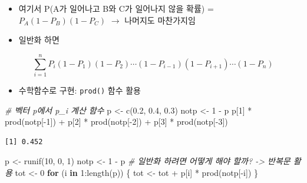 \documentclass[
  11pt,
]{krantz}
\newenvironment{Shaded}{\begin{snugshade}}{\end{snugshade}}
\newcommand{\CommentTok}[1]{\textcolor[rgb]{0.37,0.37,0.37}{\textit{#1}}}
\newcommand{\ControlFlowTok}[1]{\textcolor[rgb]{0.27,0.27,0.27}{\textbf{#1}}}
\newcommand{\DecValTok}[1]{\textcolor[rgb]{0.06,0.06,0.06}{#1}}
\newcommand{\FloatTok}[1]{\textcolor[rgb]{0.06,0.06,0.06}{#1}}
\newcommand{\FunctionTok}[1]{\textcolor[rgb]{0,0,0}{#1}}
\newcommand{\NormalTok}[1]{#1}
\newcommand{\OtherTok}[1]{\textcolor[rgb]{0.37,0.37,0.37}{#1}}
\newcommand{\SpecialCharTok}[1]{\textcolor[rgb]{0,0,0}{#1}}
\providecommand{\tightlist}{%
  \setlength{\itemsep}{0pt}\setlength{\parskip}{0pt}}
\begin{document}
\normalsize

\begin{itemize}
\tightlist
\item
  여기서 P(A가 일어나고 B와 C가 일어나지 않을 확률) = \(P_A(1-P_B)(1-P_C)\) \(\rightarrow\) 나머지도 마찬가지임
\item
  일반화 하면
\end{itemize}

\[
\sum_{i=1}^{n} P_i(1-P_1)(1-P_2)\cdots (1-P_{i-1})(1-P_{i+1})\cdots (1-P_{n})
\]

\begin{itemize}
\tightlist
\item
  수학함수로 구현: \texttt{prod()} 함수 활용
\end{itemize}

\footnotesize

\begin{Shaded}
\begin{Highlighting}[]
\CommentTok{\# 벡터 p에서 p\_i 계산 함수}
\NormalTok{p }\OtherTok{\textless{}{-}} \FunctionTok{c}\NormalTok{(}\FloatTok{0.2}\NormalTok{, }\FloatTok{0.4}\NormalTok{, }\FloatTok{0.3}\NormalTok{)}
\NormalTok{notp }\OtherTok{\textless{}{-}} \DecValTok{1} \SpecialCharTok{{-}}\NormalTok{ p}
\NormalTok{p[}\DecValTok{1}\NormalTok{] }\SpecialCharTok{*} \FunctionTok{prod}\NormalTok{(notp[}\SpecialCharTok{{-}}\DecValTok{1}\NormalTok{]) }\SpecialCharTok{+}
\NormalTok{p[}\DecValTok{2}\NormalTok{] }\SpecialCharTok{*} \FunctionTok{prod}\NormalTok{(notp[}\SpecialCharTok{{-}}\DecValTok{2}\NormalTok{]) }\SpecialCharTok{+}
\NormalTok{p[}\DecValTok{3}\NormalTok{] }\SpecialCharTok{*} \FunctionTok{prod}\NormalTok{(notp[}\SpecialCharTok{{-}}\DecValTok{3}\NormalTok{])}
\end{Highlighting}
\end{Shaded}

\begin{verbatim}
[1] 0.452
\end{verbatim}

\begin{Shaded}
\begin{Highlighting}[]
\NormalTok{p }\OtherTok{\textless{}{-}} \FunctionTok{runif}\NormalTok{(}\DecValTok{10}\NormalTok{, }\DecValTok{0}\NormalTok{, }\DecValTok{1}\NormalTok{)}
\NormalTok{notp }\OtherTok{\textless{}{-}} \DecValTok{1} \SpecialCharTok{{-}}\NormalTok{ p}
\CommentTok{\# 일반화 하려면 어떻게 해야 할까? {-}\textgreater{} 반복문 활용}
\NormalTok{tot }\OtherTok{\textless{}{-}} \DecValTok{0}
\ControlFlowTok{for}\NormalTok{ (i }\ControlFlowTok{in} \DecValTok{1}\SpecialCharTok{:}\FunctionTok{length}\NormalTok{(p)) \{}
\NormalTok{  tot }\OtherTok{\textless{}{-}}\NormalTok{ tot }\SpecialCharTok{+}\NormalTok{ p[i] }\SpecialCharTok{*} \FunctionTok{prod}\NormalTok{(notp[}\SpecialCharTok{{-}}\NormalTok{i])}
\NormalTok{\}}
\end{Highlighting}
\end{Shaded}
\end{document}

